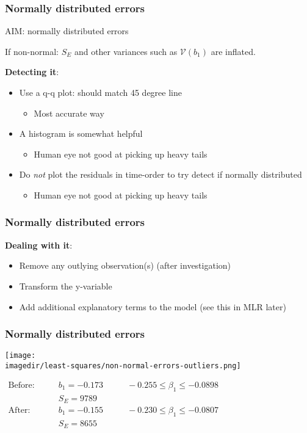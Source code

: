 \begin{frame}\frametitle{Normally distributed errors}

	AIM: normally distributed errors

	If non-normal: $S_E$ and other variances such as $\mathcal{V}(b_1)$ are inflated.

	\textbf{Detecting it}:
	\begin{itemize}
		\item	Use a q-q plot: should match 45 degree line
		\begin{itemize}
			\item	Most accurate way
		\end{itemize}
		\item	A histogram is somewhat helpful
		\begin{itemize}
			\item	Human eye not good at picking up heavy tails
		\end{itemize}
		\item	Do \emph{not} plot the residuals in time-order to try detect if normally distributed
		\begin{itemize}
			\item	Human eye not good at picking up heavy tails
		\end{itemize}
	\end{itemize}
\end{frame}

\begin{frame}\frametitle{Normally distributed errors}

	\textbf{Dealing with it}:
	\begin{itemize}
		\item	Remove any outlying observation(s) (after investigation)
		\item	Transform the y-variable
		\item	Add additional explanatory terms to the model (see this in MLR later)
	\end{itemize}
\end{frame}

\begin{frame}\frametitle{Normally distributed errors}
	\begin{center}
		\texttt{[image: \\imagedir/least-squares/non-normal-errors-outliers.png]}
	\end{center}
	$
	\begin{array}{rcccl}
		\text{Before}: \qquad & b_1 = -0.173 & \qquad -0.255 \leq \beta_1 \leq -0.0898 \\
		& S_E = 9789\\
		\text{After}: \qquad & b_1 = -0.155 & \qquad -0.230 \leq \beta_1 \leq -0.0807 \\
		&S_E = 8655
	\end{array}
	$
\end{frame}

